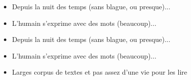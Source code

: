 \documentclass{beamer}
\begin{document}

 \begin{frame}
      
      \begin{itemize}
       
         \frametitle{Une analyse quantitative des textes? Bro, on est en sciences sociales...} \vspace{1cm}
       
            \item Depuis la nuit des temps (sans blague, ou presque)...
            
            \item L'humain s'exprime avec des mots (beaucoup)...
       
       \end{itemize}
       
  \end{frame}

     
 \begin{frame}
      
      \begin{itemize}
       
         \frametitle{Une analyse quantitative des textes? Bro, on est en sciences sociales...} \vspace{1cm}
       
            \item Depuis la nuit des temps (sans blague, ou presque)...
            
            \item L'humain s'exprime avec des mots (beaucoup)...
            
            \item Larges corpus de textes et pas assez d'une vie pour les lire
       
        \end{itemize}
       
  \end{frame}

     
\end{document}
